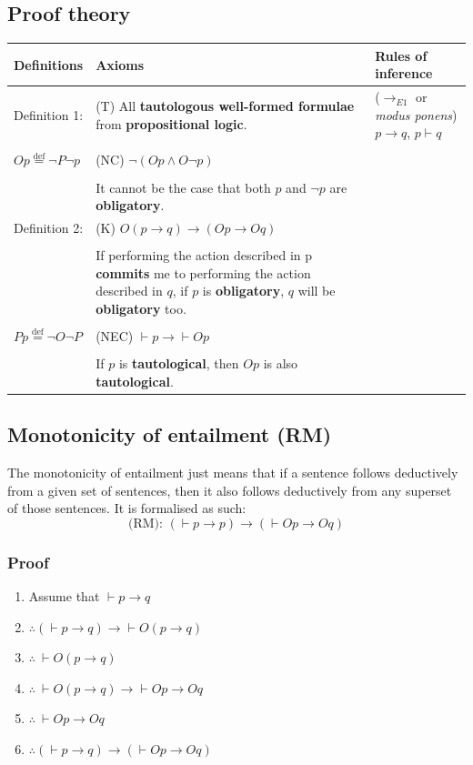 \documentclass[11pt]{article}
\newcommand{\defequal}{\stackrel{\scriptscriptstyle\mathrm{def}}{=}}
\begin{document}
\subsection{Proof theory}
\label{sec:orgba22c05}
\begin{center}
\begin{tabularx}{\textwidth}{|X|X|X|}
\hline
Definitions & Axioms & Rules of inference\\
\hline
Definition 1: & (T) All \textbf{tautologous well-formed formulae} from \textbf{propositional logic}. & (\(\rightarrow_{E1}\) or \emph{modus ponens}) \(p \rightarrow q\), \(p \vdash q\)\\
 &  & \\
\(Op \defequal \neg P \neg p\) & (NC) \(\neg (Op \wedge O \neg p)\) & \\
 &  & \\
 & It cannot be the case that both \(p\) and \(\neg p\) are \textbf{obligatory}. & \\
\hline
Definition 2: & (K) \(O(p \rightarrow q) \rightarrow (Op \rightarrow Oq)\) & \\
 &  & \\
 & If performing the action described in p \textbf{commits} me to performing the action described in \(q\), if \(p\) is \textbf{obligatory}, \(q\) will be \textbf{obligatory} too. & \\
 &  & \\
\(Pp \defequal \neg O \neg P\) & (NEC) \(\vdash p \rightarrow \vdash Op\) & \\
 &  & \\
 & If \(p\) is \textbf{tautological}, then \(Op\) is also \textbf{tautological}. & \\
\hline
\end{tabularx}
\end{center}

 \newpage
\subsection{Monotonicity of entailment (RM)}
\label{sec:orgfef082d}
The monotonicity of entailment just means that if a sentence follows deductively from a given set of sentences, then it also follows deductively from any superset of those sentences. It is formalised as such:
\[\text{(RM): } (\vdash p \rightarrow p) \rightarrow (\vdash Op \rightarrow Oq)\]
\subsubsection{Proof}
\label{sec:org76af92f}
\begin{enumerate}
\item Assume that \(\vdash p \rightarrow q\)
\item \(\therefore (\vdash p \rightarrow q) \rightarrow \vdash O(p \rightarrow q)\)
\item \(\therefore \ \vdash O(p \rightarrow q)\)
\item \(\therefore \ \vdash O(p \rightarrow q) \rightarrow \vdash Op \rightarrow Oq\)
\item \(\therefore \ \vdash Op \rightarrow Oq\)
\item \(\therefore (\vdash p \rightarrow q) \rightarrow (\vdash Op \rightarrow Oq)\)
\end{enumerate}
\end{document}

